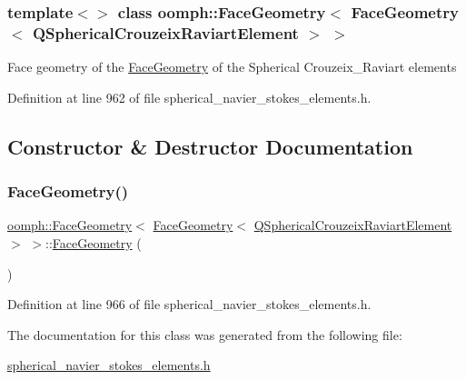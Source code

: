 \subsubsection*{template$<$$>$\newline
class oomph\+::\+Face\+Geometry$<$ Face\+Geometry$<$ Q\+Spherical\+Crouzeix\+Raviart\+Element $>$ $>$}

Face geometry of the \hyperlink{classoomph_1_1FaceGeometry}{Face\+Geometry} of the Spherical Crouzeix\+\_\+\+Raviart elements 

Definition at line 962 of file spherical\+\_\+navier\+\_\+stokes\+\_\+elements.\+h.



\subsection{Constructor \& Destructor Documentation}
\mbox{\label{classoomph_1_1FaceGeometry_3_01FaceGeometry_3_01QSphericalCrouzeixRaviartElement_01_4_01_4_a034502b9ee6215cd15ff6435c05607e4}} 
\subsubsection{\texorpdfstring{Face\+Geometry()}{FaceGeometry()}}
{\footnotesize\ttfamily \hyperlink{classoomph_1_1FaceGeometry}{oomph\+::\+Face\+Geometry}$<$ \hyperlink{classoomph_1_1FaceGeometry}{Face\+Geometry}$<$ \hyperlink{classoomph_1_1QSphericalCrouzeixRaviartElement}{Q\+Spherical\+Crouzeix\+Raviart\+Element} $>$ $>$\+::\hyperlink{classoomph_1_1FaceGeometry}{Face\+Geometry} (\begin{DoxyParamCaption}{ }\end{DoxyParamCaption})\hspace{0.3cm}{\ttfamily [inline]}}



Definition at line 966 of file spherical\+\_\+navier\+\_\+stokes\+\_\+elements.\+h.



The documentation for this class was generated from the following file\+:\begin{DoxyCompactItemize}
\item 
\hyperlink{spherical__navier__stokes__elements_8h}{spherical\+\_\+navier\+\_\+stokes\+\_\+elements.\+h}\end{DoxyCompactItemize}
